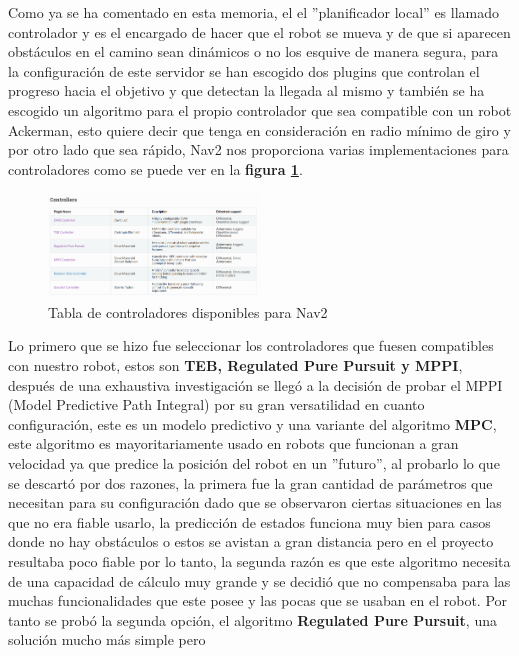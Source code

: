 Como ya se ha comentado en esta memoria, el el ''planificador local'' es llamado controlador y es el encargado de hacer que el robot se mueva 
y de que si aparecen obstáculos en el camino sean dinámicos o no los esquive de manera segura, para la configuración de este servidor se han escogido dos plugins 
que controlan el progreso hacia el objetivo y que detectan la llegada al mismo y también se ha escogido un algoritmo para el propio controlador 
que sea compatible con un robot Ackerman, esto quiere decir que tenga en consideración en radio mínimo de giro y por otro lado que sea rápido, Nav2 
nos proporciona varias implementaciones para controladores como se puede ver en la \textbf{figura \ref{fig:controllers_tabla}}. 
\begin{figure}[h]
    \centering
    \includegraphics[width=0.5\textwidth]{images/Controllers_tabla.png}
    \caption{Tabla de controladores disponibles para Nav2 \cite{nav2}}
    \label{fig:controllers_tabla}
\end{figure}
Lo primero que se hizo fue 
seleccionar los controladores que fuesen compatibles con nuestro robot, estos son \textbf{TEB, Regulated Pure Pursuit y MPPI}, después de una exhaustiva investigación 
se llegó a la decisión de probar el MPPI (Model Predictive Path Integral) por su gran versatilidad en cuanto configuración, este es un modelo predictivo y una variante del algoritmo \textbf{MPC}, este algoritmo 
es mayoritariamente usado en robots que funcionan a gran velocidad ya que predice la posición del robot en un ''futuro'', al probarlo lo que se descartó por dos 
razones, la primera fue la gran cantidad de parámetros que necesitan para su configuración dado que se observaron ciertas situaciones en las que no era fiable usarlo, la predicción 
de estados funciona muy bien para casos donde no hay obstáculos o estos se avistan a gran distancia pero en el proyecto resultaba poco fiable por lo tanto, la segunda razón 
es que este algoritmo necesita de una capacidad de cálculo muy grande y se decidió que no compensaba para las muchas funcionalidades que este posee y las pocas 
que se usaban en el robot. Por tanto se probó la segunda opción, el algoritmo \textbf{Regulated Pure Pursuit}, una solución mucho más simple pero 
